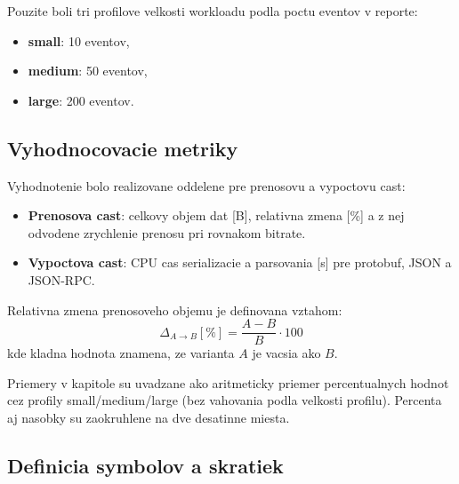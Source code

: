 \documentclass[12pt,a4paper]{report}
\begin{document}
Pouzite boli tri profilove velkosti workloadu podla poctu eventov v reporte:
\begin{itemize}
  \item \textbf{small}: 10 eventov,
  \item \textbf{medium}: 50 eventov,
  \item \textbf{large}: 200 eventov.
\end{itemize}

\subsection{Vyhodnocovacie metriky}

Vyhodnotenie bolo realizovane oddelene pre prenosovu a vypoctovu cast:
\begin{itemize}
  \item \textbf{Prenosova cast}: celkovy objem dat [B], relativna zmena [\%] a
  z nej odvodene zrychlenie prenosu pri rovnakom bitrate.
  \item \textbf{Vypoctova cast}: CPU cas serializacie a parsovania [s]
  pre protobuf, JSON a JSON-RPC.
\end{itemize}

Relativna zmena prenosoveho objemu je definovana vztahom:
\begin{equation}
\Delta_{A \rightarrow B} [\%] = \frac{A - B}{B} \cdot 100
\end{equation}
kde kladna hodnota znamena, ze varianta $A$ je vacsia ako $B$.

Priemery v kapitole su uvadzane ako aritmeticky priemer percentualnych
hodnot cez profily small/medium/large (bez vahovania podla velkosti profilu).
Percenta aj nasobky su zaokruhlene na dve desatinne miesta.

\subsection{Definicia symbolov a skratiek}
\end{document}
